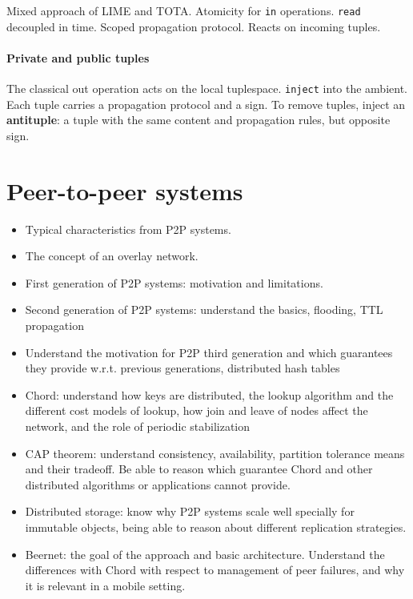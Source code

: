 \documentclass[a4paper]{report}
\begin{document}
Mixed approach of LIME and TOTA. Atomicity for \texttt{in} operations. \texttt{read} decoupled in time. Scoped propagation protocol. Reacts on incoming tuples.

\subsubsection{Private and public tuples}

The classical out operation acts on the local tuplespace. \texttt{inject} into the ambient. Each tuple carries a propagation protocol and a sign. To remove tuples, inject an \textbf{antituple}: a tuple with the same content and propagation rules, but opposite sign.


\chapter{Peer-to-peer systems}
\begin{itemize}
  \item Typical characteristics from P2P systems.
  \item The concept of an overlay network.
  \item First generation of P2P systems: motivation and limitations.
  \item Second generation of P2P systems: understand the basics, flooding, TTL propagation
  \item Understand the motivation for P2P third generation and which guarantees they
  provide w.r.t. previous generations, distributed hash tables
  \item Chord: understand how keys are distributed, the lookup algorithm and the different
  cost models of lookup, how join and leave of nodes affect the network, and the role of
  periodic stabilization
  \item CAP theorem: understand consistency, availability, partition tolerance means and their
  tradeoff. Be able to reason which guarantee Chord and other distributed algorithms or
  applications cannot provide.
  \item Distributed storage: know why P2P systems scale well specially for immutable objects,
  being able to reason about different replication strategies.
  \item Beernet: the goal of the approach and basic architecture. Understand the differences
  with Chord with respect to management of peer failures, and why it is relevant in a
  mobile setting.
\end{itemize}
\end{document}
